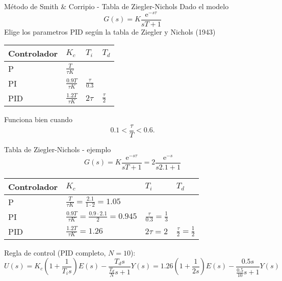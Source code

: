 \documentclass[presentation,aspectratio=1610]{beamer}
\begin{document}
\begin{frame}[label={sec:org1b1027b}]{Método de Smith \& Corripio - Tabla de Ziegler-Nichols}
Dado el modelo 
\[ G(s) = K \frac{\mathrm{e}^{-s\tau}}{sT + 1} \]
Elige los parametros PID según la tabla de Ziegler y Nichols (1943)
   \begin{center}
   \setlength{\tabcolsep}{20pt}
   \renewcommand{\arraystretch}{1.5}
   \begin{tabular}{llll}
   Controlador & \(K_c\) & \(T_i\) & \(T_d\)\\
  \hline\hline
  P & \(\frac{T}{\tau K}\) &  & \\
  PI & \(\frac{0.9T}{\tau K}\) & \(\frac{\tau}{0.3}\) & \\
  PID & \(\frac{1.2T}{\tau K}\) & \(2\tau\) & \(\frac{\tau}{2}\)\\
  \hline
\end{tabular}
\end{center}

Funciona bien cuando \[0.1 < \frac{\tau}{T} < 0.6.\]
\end{frame}


\begin{frame}[label={sec:orgd6f9fbf}]{Tabla de  Ziegler-Nichols - ejemplo}
\[ G(s) = K \frac{\mathrm{e}^{-s\tau}}{sT + 1} = 2 \frac{\mathrm{e}^{-s}}{s2.1 + 1} \]
   \begin{center}
   \setlength{\tabcolsep}{20pt}
   \renewcommand{\arraystretch}{1.5}
   \begin{tabular}{llll}
   Controlador & \(K_c\) & \(T_i\) & \(T_d\)\\
  \hline\hline
  P & \(\frac{T}{\tau K} = \frac{2.1}{1 \cdot 2} = 1.05\) &  & \\
  PI & \(\frac{0.9T}{\tau K} = \frac{0.9\cdot 2.1}{2}= 0.945\) & \(\frac{\tau}{0.3} = \frac{1}{3} \) & \\
  PID & \(\frac{1.2T}{\tau K} = 1.26 \) & \(2\tau=2\) & \(\frac{\tau}{2}=\frac{1}{2}\)\\
  \hline
\end{tabular}
\end{center}
Regla de control (PID completo, \(N=10\)):
\[ U(s) = K_c\left( 1 + \frac{1}{T_i s} \right) E(s) - \frac{T_d s}{\frac{T_d}{N} s + 1}Y(s)
           =  1.26\left( 1 + \frac{1}{2 s} \right) E(s) - \frac{0.5s}{\frac{0.5}{10} s + 1}Y(s)\]
\end{frame}
\end{document}
